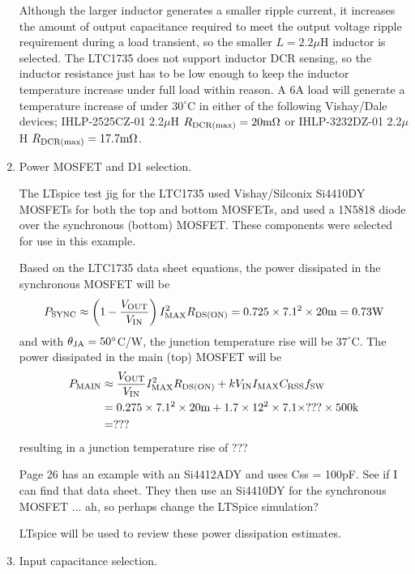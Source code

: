 \begin{enumerate}
Although the larger inductor generates a smaller ripple current,
it increases the amount of output capacitance required to meet
the output voltage ripple requirement during a load transient,
so the smaller $L = 2.2\mu$H inductor is selected.
The LTC1735 does not support inductor DCR sensing, so the inductor
resistance just has to be low enough to keep the inductor
temperature increase under full load within reason.
A 6A load will generate a temperature increase of under $30^\circ$C
in either of the following Vishay/Dale devices;
IHLP-2525CZ-01 2.2$\mu$H $R_{\rm DCR(max)} = 20\text{m}\Omega$ or
IHLP-3232DZ-01 2.2$\mu$H $R_{\rm DCR(max)} = 17.7\text{m}\Omega$.

\item Power MOSFET and D1 selection.

The LTspice test jig for the LTC1735 used Vishay/Silconix
Si4410DY MOSFETs for both the top and bottom MOSFETs, and
used a 1N5818 diode over the synchronous (bottom) MOSFET.
These components were selected for use in this example.

Based on the LTC1735 data sheet equations, the power dissipated
in the synchronous MOSFET will be
%
\begin{equation}
P_{\rm SYNC} \approx \left(1 - \frac{V_{\rm OUT}}{V_{\rm IN}}\right)
I_{\rm MAX}^2R_{\rm DS(ON)} = 0.725\times7.1^2\times20\text{m} = 0.73\text{W}
\end{equation}
%
and with $\theta_{\rm JA} = 50^\circ$C/W, the junction temperature
rise will be $37^\circ$C. The power dissipated in the main (top) MOSFET
will be
%
\begin{equation}
\begin{split}
P_{\rm MAIN} &\approx \frac{V_{\rm OUT}}{V_{\rm IN}}I_{\rm MAX}^2R_{\rm DS(ON)} +
kV_{\rm IN}I_{\rm MAX}C_{\rm RSS}f_{\rm SW}\\
&= 0.275\times7.1^2\times20\text{m} + 
1.7\times12^2\times7.1\times ??? \times 500\text{k}\\
&= ???
\end{split}
\end{equation}
%
resulting in a junction temperature rise of ???

Page 26 has an example with an Si4412ADY and uses Css = 100pF. See if
I can find that data sheet. They then use an Si4410DY for the
synchronous MOSFET ... ah, so perhaps change the LTSpice simulation?

LTspice will be used to review these power dissipation estimates.

\item Input capacitance selection.


\end{enumerate}
